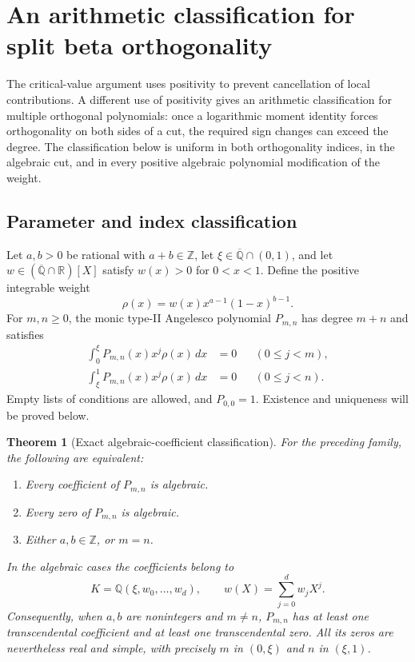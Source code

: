 \documentclass[11pt,a4paper]{article}
\newtheorem{theorem}{Theorem}[section]
\theoremstyle{definition}
\theoremstyle{remark}
\numberwithin{equation}{section}
\begin{document}
\clearpage

\section{An arithmetic classification for split beta orthogonality}
\label{E:aa:section}

The critical-value argument uses positivity to prevent cancellation of
local contributions. A different use of positivity gives an arithmetic
classification for multiple orthogonal polynomials: once a logarithmic
moment identity forces orthogonality on both sides of a cut, the required
sign changes can exceed the degree. The classification below is uniform
in both orthogonality indices, in the algebraic cut, and in every positive
algebraic polynomial modification of the weight.

\subsection{Parameter and index classification}

Let $a,b>0$ be rational with $a+b\in\mathbb Z$, let
$\xi\in\overline{\mathbb Q}\cap(0,1)$, and let
$w\in(\overline{\mathbb Q}\cap\mathbb R)[X]$ satisfy
$w(x)>0$ for $0<x<1$. Define the positive integrable weight
\[
 \rho(x)=w(x)x^{a-1}(1-x)^{b-1}.
\]
For $m,n\ge0$, the monic type-II Angelesco polynomial
$P_{m,n}$ has degree $m+n$ and satisfies
\begin{align}
 \int_0^\xi P_{m,n}(x)x^j\rho(x)\,dx&=0
       &&(0\le j<m),\label{E:aa:left}\\
 \int_\xi^1 P_{m,n}(x)x^j\rho(x)\,dx&=0
       &&(0\le j<n).\label{E:aa:right}
\end{align}
Empty lists of conditions are allowed, and $P_{0,0}=1$.
Existence and uniqueness will be proved below.

\begin{theorem}[Exact algebraic-coefficient classification]
\label{E:aa:main}
For the preceding family, the following are equivalent:
\begin{enumerate}
\item Every coefficient of $P_{m,n}$ is algebraic.
\item Every zero of $P_{m,n}$ is algebraic.
\item Either $a,b\in\mathbb Z$, or $m=n$.
\end{enumerate}
In the algebraic cases the coefficients belong to
\[
 K=\mathbb Q(\xi,w_0,\ldots,w_d),
 \qquad w(X)=\sum_{j=0}^d w_jX^j.
\]
Consequently, when $a,b$ are nonintegers and $m\ne n$,
$P_{m,n}$ has at least one transcendental coefficient and at least
one transcendental zero. All its zeros are nevertheless real and simple,
with precisely $m$ in $(0,\xi)$ and $n$ in $(\xi,1)$.
\end{theorem}
\end{document}
